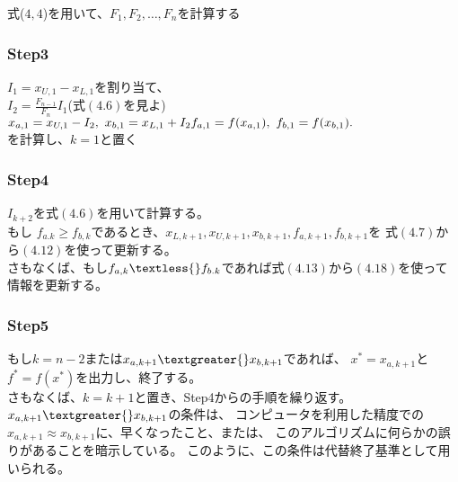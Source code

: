 式($4,4$)を用いて、$F_1, F_2, \dots ,
F_n$を計算する

\subsubsection*{Step3}\label{step3}

$I_1 = x_{U,1} -x_{L,1}$を割り当て、 \\
$I_2 = \frac{F_{n-1}}{F_n} I_1$(式$(4.6)$を見よ) \\
$
x_{a,1} = x_{U,1} - I_2, \ x_{b,1} = x_{L,1} + I_2 \\
f_{a,1} = f(x_{a,1}), \ f_{b,1} = f(x_{b,1}).
$ \\
を計算し、$k = 1$と置く

\subsubsection*{Step4}\label{step4}

$I_{k+2}$を式$(4.6)$を用いて計算する。 \\
もし $f_{a.k} \geq
f_{b,k}$であるとき、$x_{L,k+1},x_{U,k+1},x_{b,k+1},f_{a,k+1},f_{b,k+1}$を
式$(4.7)$から$(4.12)$を使って更新する。 \\
さもなくば、もし$f_{a,k} \textless{}
f_{b.k}$であれば式$(4.13)$から$(4.18)$を使って情報を更新する。

\subsubsection*{Step5}\label{step5}

もし$k = n - 2$または$x_{a,k+1} \textgreater{}
x_{b,k+1}$であれば、 $x^\ast =
x_{a,k+1}$と$f^\ast =
f(x^\ast)$を出力し、終了する。 \\
さもなくば、$k = k + 1$と置き、Step4からの手順を繰り返す。 \\
$x_{a,k+1} \textgreater{} x_{b,k+1}$の条件は、
コンピュータを利用した精度での$x_{a,k+1} \approx
x_{b,k+1}$に、早くなったこと、または、
このアルゴリズムに何らかの誤りがあることを暗示している。
このように、この条件は代替終了基準として用いられる。
